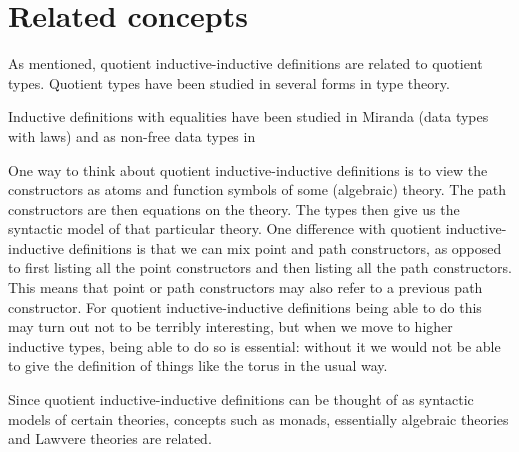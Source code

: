 \section{Related concepts}

As mentioned, quotient inductive-inductive definitions are related to
quotient types. Quotient types have been studied in several forms in
type theory.

Inductive definitions with equalities have been studied in Miranda
(data types with laws) and as non-free data types in 

One way to think about quotient inductive-inductive definitions is to
view the constructors as atoms and function symbols of some (algebraic)
theory. The path constructors are then equations on the theory. The
types then give us the syntactic model of that particular theory. One
difference with quotient inductive-inductive definitions is that we
can mix point and path constructors, as opposed to first listing all
the point constructors and then listing all the path
constructors. This means that point or path constructors may also
refer to a previous path constructor. For quotient inductive-inductive
definitions being able to do this may turn out not to be terribly
interesting, but when we move to higher inductive types, being able to
do so is essential: without it we would not be able to give the
definition of things like the torus in the usual way.

Since quotient inductive-inductive definitions can be thought of as
syntactic models of certain theories, concepts such as monads,
essentially algebraic theories and Lawvere theories are related.